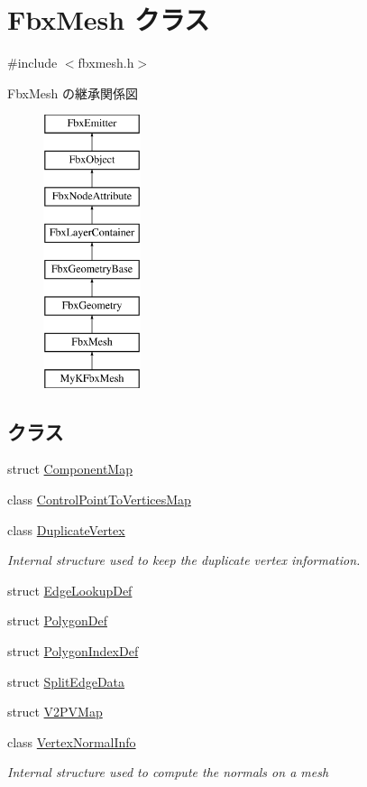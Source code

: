 \hypertarget{class_fbx_mesh}{}\section{Fbx\+Mesh クラス}
\label{class_fbx_mesh}


{\ttfamily \#include $<$fbxmesh.\+h$>$}

Fbx\+Mesh の継承関係図\begin{figure}[H]
\begin{center}
\leavevmode
\includegraphics[height=8.000000cm]{class_fbx_mesh}
\end{center}
\end{figure}
\subsection*{クラス}
\begin{DoxyCompactItemize}
\item 
struct \hyperlink{struct_fbx_mesh_1_1_component_map}{Component\+Map}
\item 
class \hyperlink{class_fbx_mesh_1_1_control_point_to_vertices_map}{Control\+Point\+To\+Vertices\+Map}
\item 
class \hyperlink{class_fbx_mesh_1_1_duplicate_vertex}{Duplicate\+Vertex}
\begin{DoxyCompactList}\small\item\em Internal structure used to keep the duplicate vertex information. \end{DoxyCompactList}\item 
struct \hyperlink{struct_fbx_mesh_1_1_edge_lookup_def}{Edge\+Lookup\+Def}
\item 
struct \hyperlink{struct_fbx_mesh_1_1_polygon_def}{Polygon\+Def}
\item 
struct \hyperlink{struct_fbx_mesh_1_1_polygon_index_def}{Polygon\+Index\+Def}
\item 
struct \hyperlink{struct_fbx_mesh_1_1_split_edge_data}{Split\+Edge\+Data}
\item 
struct \hyperlink{struct_fbx_mesh_1_1_v2_p_v_map}{V2\+P\+V\+Map}
\item 
class \hyperlink{class_fbx_mesh_1_1_vertex_normal_info}{Vertex\+Normal\+Info}
\begin{DoxyCompactList}\small\item\em Internal structure used to compute the normals on a mesh \end{DoxyCompactList}\end{DoxyCompactItemize}
